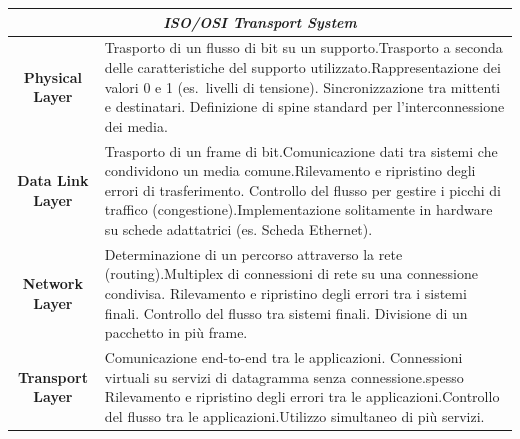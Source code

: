 \begin{table}[H]
    \centering
    \begin{tabular}{|c|m{22.7em}|}
        \hline
        \multicolumn{2}{|c|}{\textit{ISO/OSI Transport System}}                                                                                                                                                                                                                                                                                                                     \\\hline\hline
        \textbf{Physical Layer}  & Trasporto di un flusso di bit su un supporto.\newline Trasporto a seconda delle caratteristiche del supporto utilizzato.\newline Rappresentazione dei valori 0 e 1 (es.\ livelli di tensione). \newline Sincronizzazione tra mittenti e destinatari. \newline Definizione di spine standard per l'interconnessione dei media.                    \\\hline
        \textbf{Data Link Layer} & Trasporto di un frame di bit.\newline Comunicazione dati tra sistemi che condividono un media comune.\newline Rilevamento e ripristino degli errori di trasferimento. \newline Controllo del flusso per gestire i picchi di traffico (congestione).\newline Implementazione solitamente in hardware su schede adattatrici (es. Scheda Ethernet). \\\hline

        \textbf{Network Layer}   & Determinazione di un percorso attraverso la rete (routing).\newline Multiplex di connessioni di rete su una connessione condivisa. \newline Rilevamento e ripristino degli errori tra i sistemi finali. \newline Controllo del flusso tra sistemi finali. \newline Divisione di un pacchetto in più frame.                                       \\\hline
        \textbf{Transport Layer} & Comunicazione end-to-end tra le applicazioni. \newline Connessioni virtuali su servizi di datagramma senza connessione.\newline spesso Rilevamento e ripristino degli errori tra le applicazioni.\newline Controllo del flusso tra le applicazioni.\newline Utilizzo simultaneo di più servizi.                                                  \\\hline
    \end{tabular}
\end{table}

